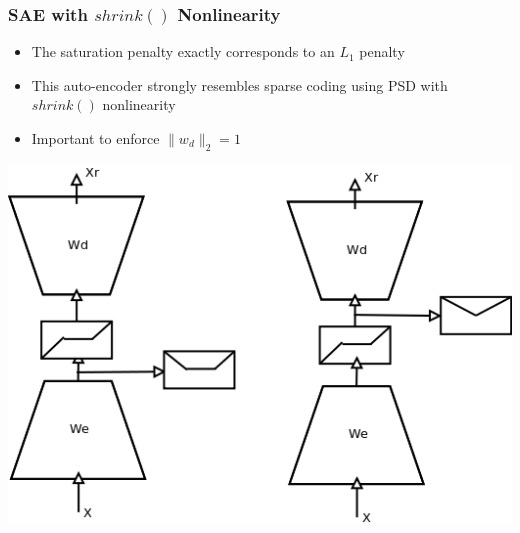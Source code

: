 \documentclass{beamer}
\begin{document}
\begin{frame}
\begin{itemize}
\begin{center}
\end{center} 
\end{itemize} 
\end{frame} 

\begin{frame} 
\frametitle{SAE with $shrink()$ Nonlinearity} 
\begin{itemize} 
\item{The saturation penalty exactly corresponds to an $L_1$ penalty}
\item{This auto-encoder strongly resembles sparse coding using PSD with $shrink()$ nonlinearity}
\item{Important to enforce $\|w_d\|_2 = 1$ }
\end{itemize} 
\begin{center} 
\includegraphics[scale = 0.25]{SAE_shrink.png}
\end{center} 
\end{frame} 
\end{document}
